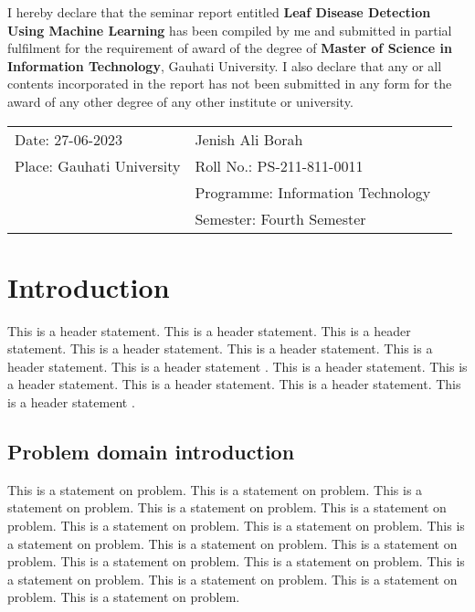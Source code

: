 \documentclass[12pt]{report}
\begin{document}
I hereby declare that the seminar report entitled \textbf{Leaf Disease Detection Using Machine Learning} has been compiled by me and
submitted in partial fulfilment for the requirement of award of the degree of \textbf{Master of Science in Information Technology}, Gauhati University. I also declare that any or all contents incorporated in
the report has not been submitted in any form for the award of any other degree of any other institute or university.

 \vspace{5cm}

\begin{tabular}{p{8cm} p{15cm} l}
Date: 27-06-2023	&	Jenish Ali Borah\\
Place: Gauhati University	&	Roll No.: PS-211-811-0011\\
	&	Programme: Information Technology\\
	&	Semester: Fourth Semester\\

\end{tabular}



\tableofcontents
\thispagestyle{empty}

\clearpage
{} 
\setcounter{page}{1}
\chapter{Introduction}
This is a header statement. This is a header statement. This is a header statement. This is a header statement. This is a header statement. This is a header statement. This is a header statement \citep{mahanta2008finding}. This is a header statement. This is a header statement. This is a header statement. This is a header statement. This is a header statement \citep{dutta2005qrock}. 
\section{Problem domain introduction}
This is a statement on problem. This is a statement on problem. This is a statement on problem. This is a statement on problem. This is a statement on problem. This is a statement on problem. This is a statement on problem. This is a statement on problem. This is a statement on problem. This is a statement on problem. This is a statement on problem. This is a statement on problem. This is a statement on problem. This is a statement on problem. This is a statement on problem. This is a statement on problem. 
\end{document}
